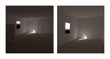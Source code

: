 \begin{figure}[t]
\newcommand{\figwidth}{0.16\textwidth}

\includegraphics[width=\figwidth]{p2r_mrc331_camera_chris_march.png} \hfill  %
\includegraphics[width=\figwidth]{p2r_065_camera_chris_march.png} \hfill %

\end{figure}
